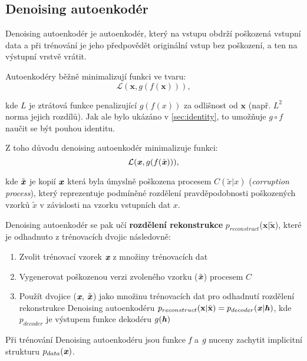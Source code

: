 \subsection{Denoising autoenkodér}
\label{sec:denoising_autoencoder}
Denoising autoenkodér je autoenkodér, který na vstupu obdrží poškozená vstupní data
a při trénování je jeho předpovědět originální vstup bez poškození, a ten na výstupní vrstvě vrátit.

Autoenkodéry běžně minimalizují funkci ve tvaru:
\begin{equation}
    \mathcal{L}(\mathbf{x}, g(f(\mathbf{x}))),
\end{equation}

kde $L$ je ztrátová funkce penalizující $g(f(x))$ za odlišnost od $\mathbf{x}$ (např. $L^2$ norma jejich rozdílů).
Jak ale bylo ukázáno v \autoref{sec:identity}, to umožňuje $g \circ f$ naučit se být pouhou identitu. 


Z toho důvodu denoising autoenkodér minimalizuje funkci:
\begin{equation}
    \mathcal{L}(\textbf{\emph{x}}, g(f(\tilde{\textbf{\emph{x}}}))),
\end{equation}

kde $\tilde{\textbf{\emph{x}}}$ je kopií $\textbf{\emph{x}}$ která byla úmyslně poškozena procesem $C(\tilde{x} | x)$ (\emph{corruption process}),
který reprezentuje podmíněné rozdělení pravděpodobnosti poškozených vzorků $\tilde{x}$ v závislosti na vzorku vstupních dat $x$. \cite{Goodfellow2016}

Denoising autoenkodér se pak učí \textbf{rozdělení rekonstrukce} $p_{reconstruct}$($\mathbf{x}|\mathbf{\tilde{x}}$),
které je odhadnuto z trénovacích dvojic následovně:

\begin{enumerate}
    \item Zvolit trénovací vzorek $\emph{\textbf{x}}$ z množiny trénovacích dat
    \item Vygenerovat poškozenou verzi zvoleného vzorku ($\tilde{\textbf{\emph{x}}}$) procesem $C$
    \item Použít dvojice ($\emph{\textbf{x}}$, $\tilde{\textbf{\emph{x}}}$) jako množinu trénovacích dat pro odhadnutí rozdělení rekonstrukce Denoising autoenkodéru $p_{reconstruct}(\textbf{x} | \tilde{\textbf{x}}) = p_{decoder}(\textbf{\emph{x}}|\textbf{\emph{h}})$, kde $p_{decoder}$ je výstupem funkce dekodéru $g(\textbf{\emph{h}})$
\end{enumerate}

Při trénování Denoising autoenkodéru jsou funkce $\emph{f}$ a $\emph{g}$ nuceny zachytit implicitní strukturu $p_{data}(\textbf{\emph{x}})$. \cite{Goodfellow2016}

